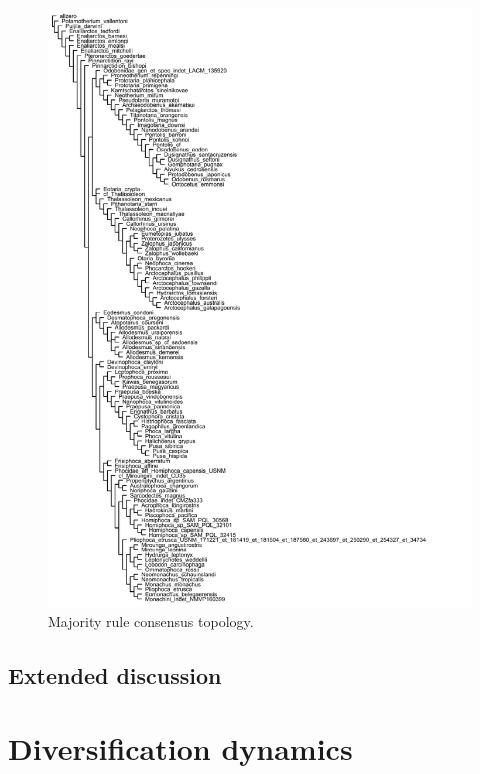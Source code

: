 \documentclass[a4paper, 12pt]{article}
\begin{document}
\begin{figure}[H]
  \centering
  \includegraphics[width = \linewidth]{figures/STR_MRC.pdf}
  \caption{Majority rule consensus topology.}
  \label{fig-mrc}
\end{figure}

\subsection{Extended discussion}

\newpage
\section{Diversification dynamics}
\end{document}
